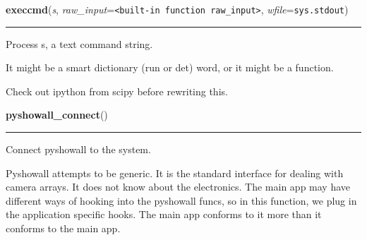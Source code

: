     \vspace{0.5ex}

    \begin{boxedminipage}{\textwidth}

    \raggedright \textbf{execcmd}(\textit{s}, \textit{raw\_input}=\texttt{{\textless}built-in function raw\_input{\textgreater}}, \textit{wfile}=\texttt{sys.stdout})

    \vspace{-1.5ex}

    \rule{\textwidth}{0.5\fboxrule}
    Process s, a text command string.

    It might be a smart dictionary (run or det) word, or it might be a 
    function.

    Check out ipython from scipy before rewriting this.

    \vspace{1ex}

    \end{boxedminipage}

    \label{pydsp:pyshowall_connect}

    \vspace{0.5ex}

    \begin{boxedminipage}{\textwidth}

    \raggedright \textbf{pyshowall\_connect}()

    \vspace{-1.5ex}

    \rule{\textwidth}{0.5\fboxrule}
    Connect pyshowall to the system.

    Pyshowall attempts to be generic. It is the standard interface for 
    dealing with camera arrays. It does not know about the electronics. The
    main app may have different ways of hooking into the pyshowall funcs, 
    so in this function, we plug in the application specific hooks. The 
    main app conforms to it more than it conforms to the main app.

    \vspace{1ex}

    \end{boxedminipage}

    \label{pydsp:cloop}

    \vspace{0.5ex}

